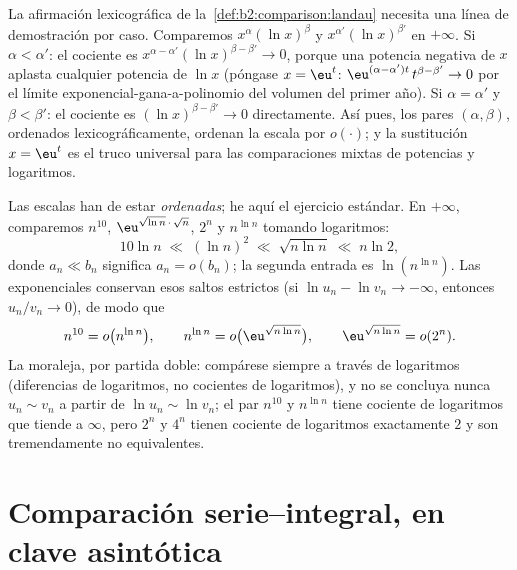 \begin{example}\label{ex:b2:comparison:scaleorder}
La afirmación lexicográfica de la~\cref{def:b2:comparison:landau} necesita una línea de
demostración por caso. Comparemos $x^{\alpha}(\ln x)^{\beta}$ y
$x^{\alpha'}(\ln x)^{\beta'}$ en $+\infty$. Si $\alpha <
\alpha'$: el cociente es $x^{\alpha - \alpha'}(\ln x)^{\beta -
\beta'} \to 0$, porque una potencia negativa de $x$ aplasta
cualquier potencia de $\ln x$ (póngase $x = \eu^t$:
$\eu^{(\alpha - \alpha')t}\,t^{\beta - \beta'} \to 0$ por el
límite exponencial-gana-a-polinomio del volumen del primer año).
Si $\alpha = \alpha'$ y $\beta < \beta'$: el cociente es $(\ln
x)^{\beta - \beta'} \to 0$ directamente. Así pues, los pares
$(\alpha, \beta)$, ordenados lexicográficamente, ordenan la
escala por $o(\cdot)$; y la sustitución $x = \eu^t$ es el truco
universal para las comparaciones mixtas de potencias y
logaritmos.
\end{example}

\begin{example}\label{ex:b2:comparison:ranking}
Las escalas han de estar \emph{ordenadas}; he aquí el ejercicio
estándar. En $+\infty$, comparemos $n^{10}$,
$\eu^{\sqrt{\ln n}\,\cdot\,\sqrt n}$, $2^n$ y $n^{\ln n}$ tomando
logaritmos:
\[
10\ln n
\;\ll\; (\ln n)^2
\;\ll\; \sqrt{n\ln n}
\;\ll\; n\ln 2 ,
\]
donde $a_n \ll b_n$ significa $a_n = o(b_n)$; la segunda entrada es
$\ln(n^{\ln n})$. Las exponenciales conservan esos saltos estrictos
(si $\ln u_n - \ln v_n \to -\infty$, entonces $u_n/v_n \to 0$), de
modo que
\[
n^{10} = o\bigl(n^{\ln n}\bigr),
\qquad
n^{\ln n} = o\bigl(\eu^{\sqrt{n\ln n}}\bigr),
\qquad
\eu^{\sqrt{n\ln n}} = o(2^n) .
\]
La moraleja, por partida doble: compárese siempre a través de
logaritmos (diferencias de logaritmos, no cocientes de logaritmos),
y no se concluya nunca $u_n \sim v_n$ a partir de $\ln u_n \sim \ln
v_n$; el par $n^{10}$ y $n^{\ln n}$ tiene cociente de logaritmos
que tiende a $\infty$, pero $2^n$ y $4^n$ tienen cociente de
logaritmos exactamente $2$ y son tremendamente no equivalentes.
\end{example}

\section{Comparación serie--integral, en clave asintótica}

